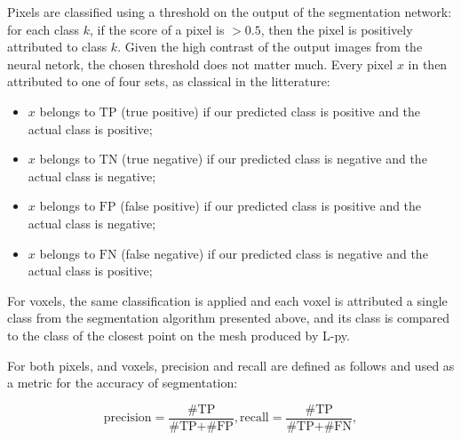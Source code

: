 Pixels are classified using a threshold on the output of the segmentation
network: for each class $k$, if the score of a pixel is $>0.5$, then the pixel is
positively attributed to class $k$. Given the high contrast of the output images
from the neural netork, the chosen threshold does not matter much. Every pixel
$x$ in then attributed to one of four sets, as classical in the litterature:

\begin{itemize}
    \item $x$ belongs to $\textrm{TP}$ (true positive) if our predicted class is positive and the actual class is
positive;
    \item $x$ belongs to $\textrm{TN}$ (true negative) if our predicted class is negative and the actual class is
negative;
    \item $x$ belongs to $\textrm{FP}$ (false positive) if our predicted class is positive and the actual class is
negative;
    \item $x$ belongs to $\textrm{FN}$ (false negative) if our predicted class is negative and the actual class is
positive;
\end{itemize}

For voxels, the same classification is applied and each voxel is attributed a single class
from the segmentation algorithm presented above, and its class is compared to
the class of the closest point on the mesh produced by L-py.

For both pixels, and voxels, precision and recall are defined as follows and
used as a metric for the accuracy of segmentation:

$$
    \textrm{precision} = \frac{\textrm{\# TP} }{\textrm{\# TP} + \textrm{\# FP}},
    \textrm{recall} = \frac{\textrm{\# TP} }{\textrm{\# TP} + \textrm{\# FN}},
$$

